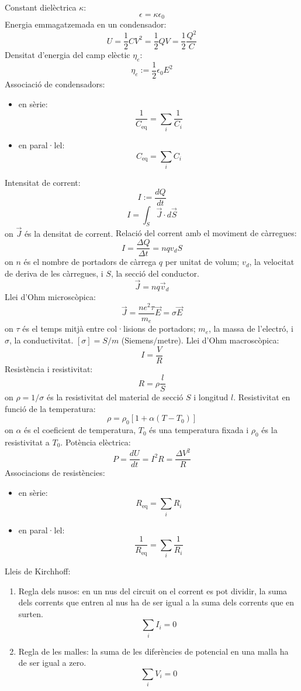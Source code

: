 \documentclass[class=article,10pt,crop=false]{standalone}
\begin{document}
\begin{multicols}{2}
Constant dielèctrica $\kappa$: $$\epsilon=\kappa\epsilon_0$$
Energia emmagatzemada en un condensador: $$U=\frac{1}{2}CV^2=\frac{1}{2}QV=\frac{1}{2}\frac{Q^2}{C}$$
Densitat d'energia del camp elèctic $\eta_e$: $$\eta_e:=\frac{1}{2}\epsilon_0E^2$$
Associació de condensadors:
\begin{itemize}
    \item en sèrie:$$\frac{1}{C_{\text{eq}}}=\sum_i\frac{1}{C_i}$$
    \item en paral·lel: $$C_{\text{eq}}=\sum_iC_i$$ 
\end{itemize}
Intensitat de corrent: $$I:=\frac{dQ}{dt}$$
$$I=\int_S \Vec{J}\cdot d\Vec{S}$$ {on $\Vec{J}$ és la densitat de corrent.}\newline
Relació del corrent amb el moviment de càrregues:
$$I=\frac{\Delta Q}{\Delta t}=nqv_dS$$ {on $n$ és el nombre de portadors de càrrega $q$ per unitat de volum; $v_d$, la velocitat de deriva de les càrregues, i $S$, la secció del conductor.}
$$\Vec{J}=nq\Vec{v}_d$$
Llei d'Ohm microscòpica: $$\Vec{J}=\frac{ne^2\tau}{m_e}\Vec{E}=\sigma\Vec{E}$$ {on $\tau$ és el temps mitjà entre col·lisions de portadors; $m_e$, la massa de l'electró, i $\sigma$, la conductivitat. $[\sigma]=S/m$ (Siemens$/$metre).}\newline
Llei d'Ohm macroscòpica: $$I=\frac{V}{R}$$
Resistència i resistivitat: $$R=\rho\frac{l}{S}$$ {on $\rho=1/\sigma$ és la resistivitat del material de secció $S$ i longitud $l$.}\newline
Resistivitat en funció de la temperatura: $$\rho=\rho_0[1+\alpha(T-T_0)]$$ {on $\alpha$ és el coeficient de temperatura, $T_0$ és una temperatura fixada i $\rho_0$ és la resistivitat a $T_0$.}\newline
Potència elèctrica: $$P=\frac{dU}{dt}=I^2R=\frac{\Delta V^2}{R}$$
Associacions de resistències: 
\begin{itemize}
    \item en sèrie:$$R_{\text{eq}}=\sum_iR_i$$
    \item en paral·lel: $$\frac{1}{R_{\text{eq}}}=\sum_i\frac{1}{R_i}$$
\end{itemize}
Lleis de Kirchhoff:
\begin{enumerate}
    \item Regla dels nusos: en un nus del circuit on el corrent es pot dividir, la suma dels corrents que entren al nus ha de ser igual a la suma dels corrents que en surten. $$\sum_iI_i=0$$
    \item Regla de les malles: la suma de les diferències de potencial en una malla ha de ser igual a zero. $$\sum_iV_i=0$$

\end{enumerate}
\end{multicols}
\end{document}
